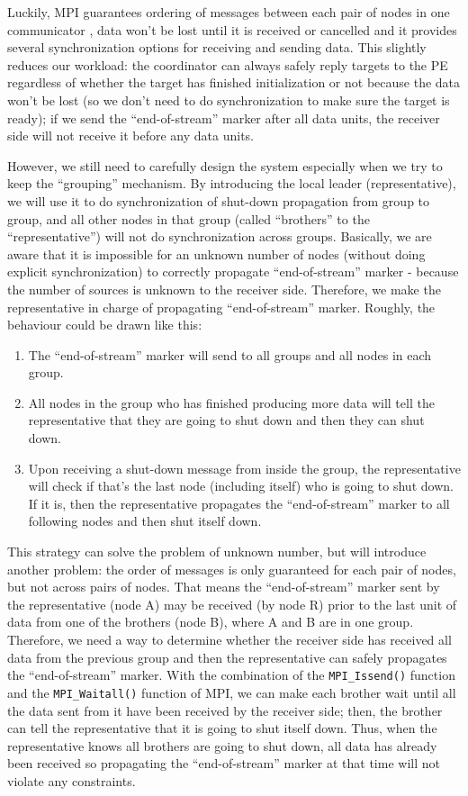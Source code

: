 Luckily, MPI guarantees ordering of messages between each pair of nodes in one communicator \cite{MPI-3.0}, data won't be lost until it is received or cancelled and it provides several synchronization options for receiving and sending data. This slightly reduces our workload: the coordinator can always safely reply targets to the PE regardless of whether the target has finished initialization or not because the data won't be lost (so we don't need to do synchronization to make sure the target is ready); if we send the ``end-of-stream'' marker after all data units, the receiver side will not receive it before any data units.

However, we still need to carefully design the system especially when we try to keep the ``grouping'' mechanism. By introducing the local leader (\ie representative), we will use it to do synchronization of shut-down propagation from group to group, and all other nodes in that group (called ``brothers'' to the ``representative'') will not do synchronization across groups. Basically, we are aware that it is impossible for an unknown number of nodes (without doing explicit synchronization) to correctly propagate ``end-of-stream'' marker - because the number of sources is unknown to the receiver side. Therefore, we make the representative in charge of propagating ``end-of-stream'' marker. Roughly, the behaviour could be drawn like this:
\begin{enumerate}
	\item The ``end-of-stream'' marker will send to all groups and all nodes in each group.
	\item All nodes in the group who has finished producing more data will tell the representative that they are going to shut down and then they can shut down.
	\item Upon receiving a shut-down message from inside the group, the representative will check if that's the last node (including itself) who is going to shut down. If it is, then the representative propagates the ``end-of-stream'' marker to all following nodes and then shut itself down.
\end{enumerate}

This strategy can solve the problem of unknown number, but will introduce another problem: the order of messages is only guaranteed for each pair of nodes, but not across pairs of nodes. That means the ``end-of-stream'' marker sent by the representative (node A) may be received (by node R) prior to the last unit of data from one of the brothers (node B), where A and B are in one group.
 Therefore, we need a way to determine whether the receiver side has received all data from the previous group and then the representative can safely propagates the ``end-of-stream'' marker. With the combination of the 
\lstinline|MPI_Issend()| function and the \lstinline|MPI_Waitall()| function of MPI, we can make each brother wait until all the data sent from it have been received by the receiver side; then, the brother can tell the representative that it is going to shut itself down. Thus, when the representative knows all brothers are going to shut down, all data has already been received so propagating the ``end-of-stream'' marker at that time will not violate any constraints.

